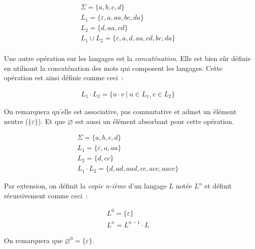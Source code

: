 
\begin{example}
    \begin{gather*}
        \Sigma = \{a, b, c, d\} \\
        L_1 = \{\varepsilon, a, aa, bc, da\} \\
        L_2 = \{d, aa, cd\} \\
        L_1 \cup L_2 = \{\varepsilon, a, d, aa, cd, bc, da\} \\
    \end{gather*}
\end{example}

\begin{definition}
    Une autre opération sur les langages est la \textit{concaténation}. Elle
    est bien sûr définie en utilisant la concaténation des mots qui composent
    les langages. Cette opération est ainsi définie comme ceci~:

    \begin{gather*}
        L_1 \cdot L_2 = \{u \cdot v ~|~ u \in L_1, v \in L_2\}
    \end{gather*}

    \noindent On remarquera qu'elle est associative, pas commutative et admet un
    élément neutre (\(\{\varepsilon\}\)). Et que \(\varnothing\) est aussi un
    élément absorbant pour cette opération.
\end{definition}

\begin{example}
    \begin{gather*}
        \Sigma = \{a, b, c, d\} \\
        L_1 = \{\varepsilon, a, aa\} \\
        L_2 = \{d, cc\} \\
        L_1 \cdot L_2 = \{d, ad, aad, cc, acc, aacc\}
    \end{gather*}
\end{example}

\begin{definition}
    Par extension, on définit la \textit{copie n-ième} d'un langage \(L\) notée
    \(L^n\) et définit récursivement comme ceci~:

    \begin{gather*}
        L^0 = \{\varepsilon\} \\
        L^n = L^{n - 1} \cdot L
    \end{gather*}

    \noindent On remarquera que \(\varnothing^0 = \{\varepsilon\}\).
\end{definition}

